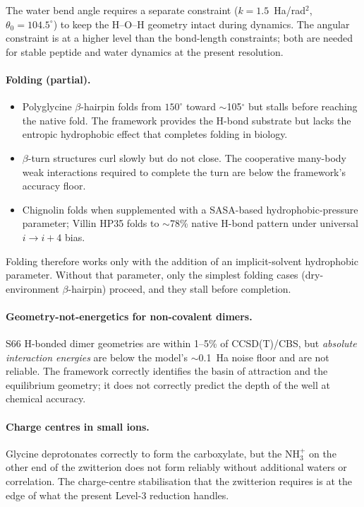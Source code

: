 The water bend angle requires a separate constraint ($k = 1.5$~Ha/rad$^2$, $\theta_0 = 104.5^\circ$) to keep the H--O--H geometry intact during dynamics. The angular constraint is at a higher level than the bond-length constraints; both are needed for stable peptide and water dynamics at the present resolution.

\paragraph{Folding (partial).}
\begin{itemize}
\item Polyglycine $\beta$-hairpin folds from $150^\circ$ toward $\sim$105$^\circ$ but stalls before reaching the native fold. The framework provides the H-bond substrate but lacks the entropic hydrophobic effect that completes folding in biology.
\item $\beta$-turn structures curl slowly but do not close. The cooperative many-body weak interactions required to complete the turn are below the framework's accuracy floor.
\item Chignolin folds when supplemented with a SASA-based hydrophobic-pressure parameter; Villin HP35 folds to $\sim$78\% native H-bond pattern under universal $i \to i{+}4$ bias.
\end{itemize}
Folding therefore works only with the addition of an implicit-solvent hydrophobic parameter. Without that parameter, only the simplest folding cases (dry-environment $\beta$-hairpin) proceed, and they stall before completion.

\paragraph{Geometry-not-energetics for non-covalent dimers.}
S66 H-bonded dimer geometries are within 1--5\% of CCSD(T)/CBS, but \emph{absolute interaction energies} are below the model's $\sim$0.1~Ha noise floor and are not reliable. The framework correctly identifies the basin of attraction and the equilibrium geometry; it does not correctly predict the depth of the well at chemical accuracy.

\paragraph{Charge centres in small ions.}
Glycine deprotonates correctly to form the carboxylate, but the NH$_3^+$ on the other end of the zwitterion does not form reliably without additional waters or correlation. The charge-centre stabilisation that the zwitterion requires is at the edge of what the present Level-3 reduction handles.

